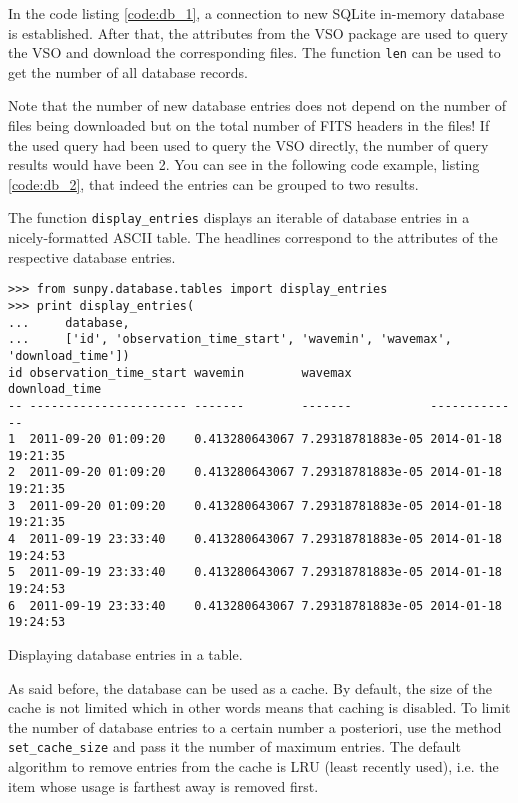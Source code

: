 In the code listing \ref{code:db_1}, a connection to new SQLite in-memory
database is established. After that, the attributes from the \textsc{VSO}
package are used to query the \textsc{VSO} and download the corresponding
files. The function \texttt{len} can be used to get the number of all database
records.

Note that the number of new database entries does not depend on the
number of files being downloaded but on the total number of \textsc{FITS}
headers in the files! If the used query had been used to query the \textsc{VSO}
directly, the number of query results would have been 2. You can see in the
following code example, listing \ref{code:db_2}, that indeed the entries can
be grouped to two results.

The function \texttt{display\_entries} displays an iterable of database entries
in a nicely-formatted \textsc{ASCII} table. The headlines correspond to the
attributes of the respective database entries.

\begin{listing}
\begin{verbatim}
>>> from sunpy.database.tables import display_entries
>>> print display_entries(
...     database,
...     ['id', 'observation_time_start', 'wavemin', 'wavemax', 'download_time'])
id observation_time_start wavemin        wavemax           download_time      
-- ---------------------- -------        -------           -------------      
1  2011-09-20 01:09:20    0.413280643067 7.29318781883e-05 2014-01-18 19:21:35
2  2011-09-20 01:09:20    0.413280643067 7.29318781883e-05 2014-01-18 19:21:35
3  2011-09-20 01:09:20    0.413280643067 7.29318781883e-05 2014-01-18 19:21:35
4  2011-09-19 23:33:40    0.413280643067 7.29318781883e-05 2014-01-18 19:24:53
5  2011-09-19 23:33:40    0.413280643067 7.29318781883e-05 2014-01-18 19:24:53
6  2011-09-19 23:33:40    0.413280643067 7.29318781883e-05 2014-01-18 19:24:53
\end{verbatim}
\caption{Displaying database entries in a table.}
\label{code:db_2}
\end{listing}

As said before, the database can be used as a cache. By default, the size of
the cache is not limited which in other words means that caching is disabled.
To limit the number of database entries to a certain number a posteriori, use
the method \texttt{set\_cache\_size} and pass it the number of maximum entries.
The default algorithm to remove entries from the cache is \textsc{LRU}
(least recently used), i.e. the item whose usage is farthest away is removed
first.  %

